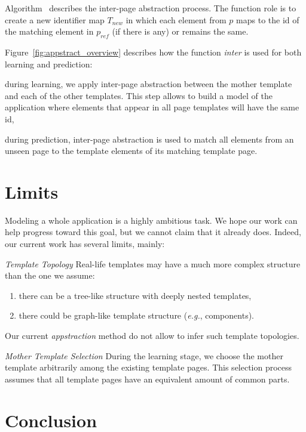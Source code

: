 Algorithm~\label{alg:inter-page} describes the inter-page abstraction process.
The function role is to create a new identifier map $T_{new}$ in which each element from $p$ maps to the id of the matching element in $p_{ref}$ (if there is any) or remains the same.

Figure~\ref{fig:appstract_overview} describes how the function \emph{inter} is used for both learning and prediction:
\begin{compactenum}
    \item during learning, we apply inter-page abstraction between the mother template and each of the other templates. This step allows to build a model of the application where elements that appear in all page templates will have the same id,
    \item during prediction, inter-page abstraction is used to match all elements from an unseen page to the template elements of its matching template page.
\end{compactenum}


\section{Limits}
Modeling a whole application is a highly ambitious task.
We hope our work can help progress toward this goal, but we cannot claim that it already does.
Indeed, our current work has several limits, mainly:

\emph{Template Topology}
Real-life templates may have a much more complex structure than the one we assume:
\begin{enumerate}
\item there can be a tree-like structure with deeply nested templates,
\item there could be graph-like template structure (\emph{e.g.}, components).
\end{enumerate}
Our current \emph{appstraction} method do not allow to infer such template topologies.

\emph{Mother Template Selection}
During the learning stage, we choose the mother template arbitrarily among the existing template pages.
This selection process assumes that all template pages have an equivalent amount of common parts.

\section{Conclusion}\label{sec:conclusion}



